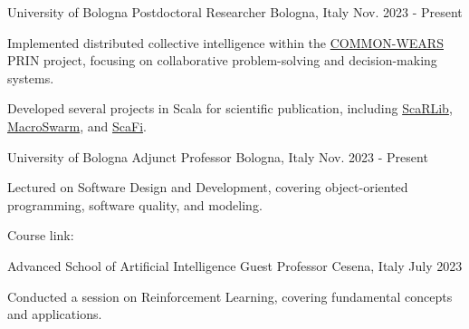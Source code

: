 
\begin{cventries}

\cventry
{University of Bologna} %
{Postdoctoral Researcher} %
{Bologna, Italy} %
{Nov. 2023 - Present} %
{
  \begin{cvitems} %
    \item {Implemented distributed collective intelligence within the \href{https://informatica.unito.it/do/progetti.pl/Show?_id=4rru}{\url{COMMON-WEARS}} PRIN project, focusing on collaborative problem-solving and decision-making systems.}
    \item {Developed several projects in Scala for scientific publication, including \href{https://github.com/ScaRLib-group/ScaRLib}{\url{ScaRLib}}, \href{https://github.com/scafi/macro-swarm}{\url{MacroSwarm}}, and \href{https://github.com/scafi/scafi}{\url{ScaFi}}.}
  \end{cvitems}
}

\cventry
{University of Bologna} %
{Adjunct Professor} %
{Bologna, Italy} %
{Nov. 2023 - Present} %
{
  \begin{cvitems} %
    \item {Lectured on Software Design and Development, covering object-oriented programming, software quality, and modeling.}
    \item Course link: {\href{https://www.unibo.it/en/study/phd-professional-masters-specialisation-schools-and-other-programmes/course-unit-catalogue/course-unit/2023/498808}{\faLink}}
  \end{cvitems}
}

\cventry
{Advanced School of Artificial Intelligence} %
{Guest Professor} %
{Cesena, Italy} %
{July 2023} %
{
  \begin{cvitems} %
    \item {Conducted a session on Reinforcement Learning, covering fundamental concepts and applications.}
  \end{cvitems}
}


\end{cventries}
